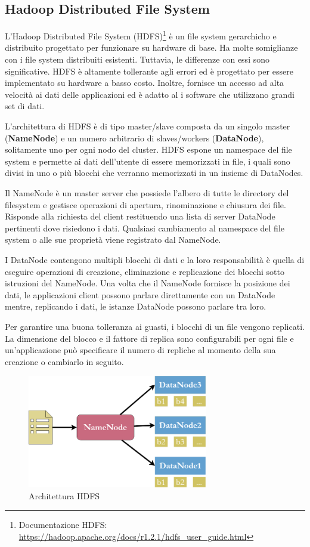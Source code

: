 \subsection{Hadoop Distributed File System} \label{hdfs}
L'Hadoop Distributed File System (HDFS)\footnote{Documentazione HDFS: \href{https://hadoop.apache.org/docs/r1.2.1/hdfs\_user\_guide.html}{https://hadoop.apache.org/docs/r1.2.1/hdfs\_user\_guide.html}} è un file system gerarchicho e distribuito progettato per funzionare su hardware di base. Ha molte somiglianze con i file system distribuiti esistenti. Tuttavia, le differenze con essi sono significative. HDFS è altamente tollerante agli errori ed è progettato per essere implementato su hardware a basso costo. Inoltre, fornisce un accesso ad alta velocità ai dati delle applicazioni ed è adatto al i software che utilizzano grandi set di dati.

L'architettura di HDFS è di tipo master/slave composta da un singolo master (\textbf{NameNode}) e un numero arbitrario di slaves/workers (\textbf{DataNode}), solitamente uno per ogni nodo del cluster. HDFS espone un namespace del file system e permette ai dati dell'utente di essere memorizzati in file, i quali sono divisi in uno o più blocchi che verranno memorizzati in un insieme di DataNodes. 

Il NameNode è un master server che possiede l'albero di tutte le directory del filesystem e gestisce operazioni di apertura, rinominazione e chiusura dei file. Risponde alla richiesta del client restituendo una lista di server DataNode pertinenti dove risiedono i dati. Qualsiasi cambiamento al namespace del file system o alle sue proprietà viene registrato dal NameNode. 

I DataNode contengono multipli blocchi di dati e la loro responsabilità è quella di eseguire operazioni di creazione, eliminazione e replicazione dei blocchi sotto istruzioni del NameNode. Una volta che il NameNode fornisce la posizione dei dati, le applicazioni client possono parlare direttamente con un DataNode mentre, replicando i dati, le istanze DataNode possono parlare tra loro.

Per garantire una buona tolleranza ai guasti, i blocchi di un file vengono replicati. La dimensione del blocco e il fattore di replica sono configurabili per ogni file e un'applicazione può specificare il numero di repliche al momento della sua creazione o cambiarlo in seguito.
\begin{figure}[hbt!]
    \centering
    \includegraphics[width=0.7\textwidth]{img/hdfs.png}
    \caption{Architettura HDFS}
    \label{fig:hdfs_architettura}
\end{figure}

